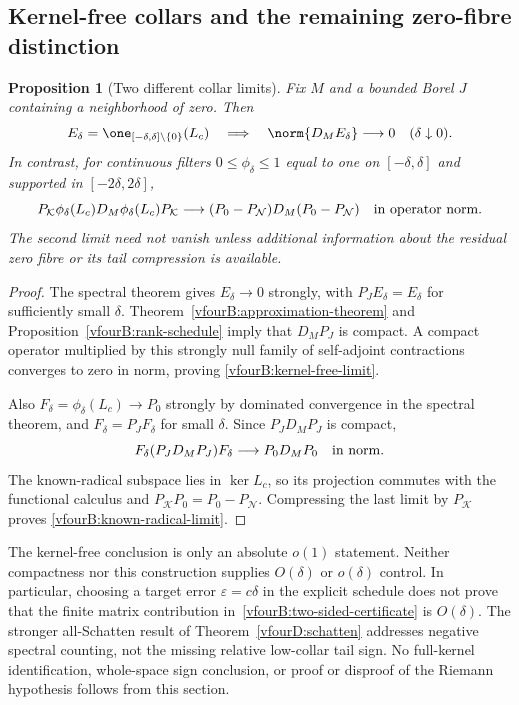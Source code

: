 \documentclass[11pt,a4paper]{article}
\numberwithin{equation}{section}
\newtheorem{proposition}[theorem]{Proposition}
\theoremstyle{definition}\newtheorem{definition}[theorem]{Definition}
\theoremstyle{remark}\newtheorem{remark}[theorem]{Remark}
\newcommand{\Nn}{\mathcal N}\newcommand{\Ii}{\mathcal I}\newcommand{\Zz}{\mathcal Z}
\newcommand{\Kk}{\mathcal K}\newcommand{\Aa}{\mathcal A}\newcommand{\Ff}{\mathcal F}
\begin{document}
\subsection{Kernel-free collars and the remaining zero-fibre distinction}
\label{vfourB:collars}

\begin{proposition}[Two different collar limits]
\label{vfourB:collar-limits}
Fix $M$ and a bounded Borel $J$ containing a neighborhood of zero. Then
\begin{equation}\label{vfourB:kernel-free-limit}
 E_\delta=\one_{[-\delta,\delta]\setminus\{0\}}(L_c)
 \quad\Longrightarrow\quad
 \norm{D_ME_\delta}\longrightarrow0
 \quad(\delta\downarrow0).
\end{equation}
In contrast, for continuous filters $0\le\phi_\delta\le1$ equal to one
on $[-\delta,\delta]$ and supported in $[-2\delta,2\delta]$,
\begin{equation}\label{vfourB:known-radical-limit}
 P_\Kk\phi_\delta(L_c)D_M\phi_\delta(L_c)P_\Kk
 \longrightarrow (P_0-P_\Nn)D_M(P_0-P_\Nn)
 \quad\hbox{in operator norm}.
\end{equation}
The second limit need not vanish unless additional information about
the residual zero fibre or its tail compression is available.
\end{proposition}
\begin{proof}
The spectral theorem gives $E_\delta\to0$ strongly, with
$P_JE_\delta=E_\delta$ for sufficiently small $\delta$.
Theorem~\ref{vfourB:approximation-theorem} and
Proposition~\ref{vfourB:rank-schedule} imply that $D_MP_J$ is compact.
A compact operator multiplied by this strongly null family of
self-adjoint contractions converges to zero in norm, proving
\eqref{vfourB:kernel-free-limit}.

Also $F_\delta=\phi_\delta(L_c)\to P_0$ strongly by dominated convergence
in the spectral theorem, and $F_\delta=P_JF_\delta$ for small $\delta$.
Since $P_JD_MP_J$ is compact,
\[
 F_\delta(P_JD_MP_J)F_\delta\longrightarrow P_0D_MP_0
 \quad\hbox{in norm}.
\]
The known-radical subspace lies in $\ker L_c$, so its projection commutes
with the functional calculus and $P_\Kk P_0=P_0-P_\Nn$.
Compressing the last limit by $P_\Kk$ proves
\eqref{vfourB:known-radical-limit}.
\end{proof}

The kernel-free conclusion is only an absolute $o(1)$ statement.
Neither compactness nor this construction supplies $O(\delta)$ or
$o(\delta)$ control. In particular, choosing a target error
$\varepsilon=c\delta$ in the explicit schedule does not prove that the
finite matrix contribution in~\eqref{vfourB:two-sided-certificate} is
$O(\delta)$. The stronger all-Schatten result of
Theorem~\ref{vfourD:schatten} addresses negative spectral counting, not
the missing relative low-collar tail sign. No full-kernel identification,
whole-space sign conclusion, or proof or disproof of the Riemann
hypothesis follows from this section.
\end{document}
